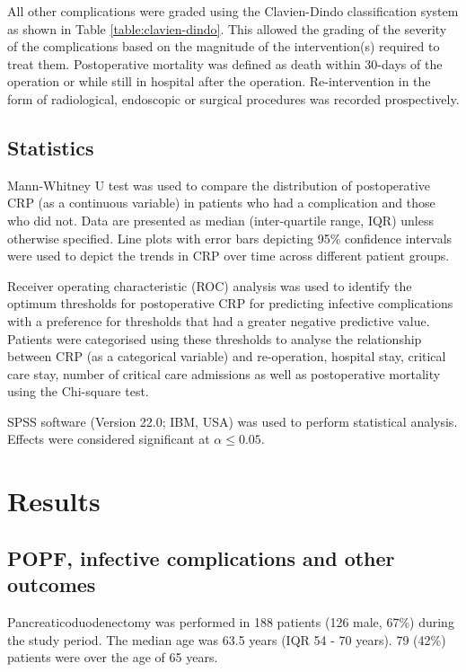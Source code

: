 All other complications were graded using the Clavien-Dindo classification system as shown in Table \ref{table:clavien-dindo}. 
This allowed the grading of the severity of the complications based on the magnitude of the intervention(s) required to treat them. 
Postoperative mortality was defined as death within 30-days of the operation or while still in hospital after the operation. 
Re-intervention in the form of radiological, endoscopic or surgical procedures was recorded prospectively.

\subsection{Statistics}
Mann-Whitney U test was used to compare the distribution of postoperative CRP (as a continuous variable) in patients who had a complication and those who did not. 
Data are presented as median (inter-quartile range, IQR) unless otherwise specified. 
Line plots with error bars depicting 95\% confidence intervals were used to depict the trends in CRP over time across different patient groups. 

Receiver operating characteristic (ROC) analysis \parencite{robertson_use_1981,zweig_receiver-operating_1993} was used to identify the optimum thresholds for postoperative CRP for predicting infective complications with a preference for thresholds that had a greater negative predictive value. 
Patients were categorised using these thresholds to analyse the relationship between CRP (as a categorical variable) and re-operation, hospital stay, critical care stay, number of critical care admissions as well as postoperative mortality using the Chi-square test. 

SPSS software (Version 22.0; IBM, USA) was used to perform statistical analysis. 
Effects were considered significant at $\alpha \leq0.05$. 

\clearpage
\section{Results}

\subsection{POPF, infective complications and other outcomes}
Pancreaticoduodenectomy was performed in 188 patients (126 male, 67\%) during the study period. 
The median age was 63.5 years (IQR 54 - 70 years). 79 (42\%) patients were over the age of 65 years. 

